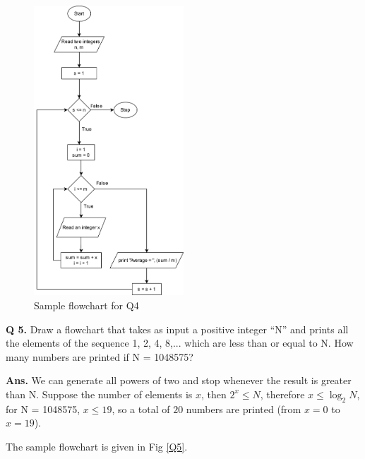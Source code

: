 \documentclass{article}
\begin{document}
    \begin{figure}[ht]
        \centering
        \includegraphics[width=0.5\textwidth]{Q4.png}
        \caption{Sample flowchart for Q4}
        \label{Q4}
    \end{figure}
    
    \clearpage


\begin{flushleft}
    \textbf{Q 5. } Draw a flowchart that takes as input a positive integer “N” 
    and prints all the elements of the sequence 1, 2, 4, 8,... which are less 
    than or equal to N. 
    How many numbers are printed if N = 1048575?
    
    \end{flushleft}
    
    \begin{flushleft}
    
    \textbf{Ans. } We can generate all powers of two and stop whenever the result
    is greater than N. Suppose the number of elements is $x$, then $2^x \leq N$,
    therefore $x \leq \log_2{N}$, for N = 1048575, $x \leq 19$, so a total of $20$
    numbers are printed (from $x = 0$ to $x = 19$).

    The sample flowchart is given in Fig \ref{Q5}.
    
    \end{flushleft}
    
\end{document}
